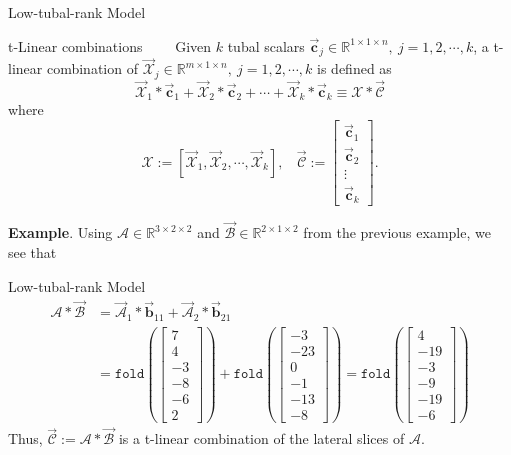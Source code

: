 \documentclass[t, 10pt, handout, aspectratio=169]{beamer}
\begin{document}
\begin{frame}{Low-tubal-rank Model}
\begin{block}{t-Linear combinations}
~~~~Given $k$ tubal scalars $\vec{\mathbf{c}}_j\in\mathbb{R}^{1\times 1\times n},~j=1,2,\cdots,k$, a t-linear combination of $\vec{\mathcal{X}}_j\in \mathbb{R}^{m\times 1\times n},~j=1,2,\cdots,k$ is defined as
$$
\vec{\mathcal{X}}_1*\vec{\mathbf{c}}_1 + \vec{\mathcal{X}}_2 * \vec{\mathbf{c}}_2 + \cdots + \vec{\mathcal{X}}_k * \vec{\mathbf{c}}_k \equiv \mathcal{X} * \vec{\mathcal{C}}
$$
where
$$
\mathcal{X} := \left[\vec{\mathcal{X}}_1, \vec{\mathcal{X}}_2, \cdots, \vec{\mathcal{X}}_k\right],~~~~\vec{\mathcal{C}}:=\left[\begin{matrix}
\vec{\mathbf{c}}_1\\
\vec{\mathbf{c}}_2\\
\vdots\\
\vec{\mathbf{c}}_k
\end{matrix}\right].
$$
\end{block}
\textbf{Example}. Using $\mathcal{A}\in\mathbb{R}^{3\times 2 \times 2}$ and $\vec{\mathcal{B}}\in\mathbb{R}^{2\times 1\times 2}$ from the previous example, we see that

\end{frame}

\begin{frame}{Low-tubal-rank Model}
$$
\begin{aligned}
\mathcal{A}*\vec{\mathcal{B}} & = \vec{\mathcal{A}}_1 * \vec{\mathbf{b}}_{11} + \vec{\mathcal{A}}_2 * \vec{\mathbf{b}}_{21} \\
& = \texttt{fold}\left(
\left[\begin{array}{c}
7\\
4\\
-3\\
\hline
-8\\
-6\\
2
\end{array}\right]
\right) + \texttt{fold}\left(
\left[\begin{array}{c}
-3\\
-23\\
0\\
\hline
-1\\
-13\\
-8
\end{array}\right]
\right)=\texttt{fold}\left(
\left[\begin{array}{c}
4\\
-19\\
-3\\
\hline
-9\\
-19\\
-6
\end{array}\right]
\right)
\end{aligned}
$$
Thus, $\vec{\mathcal{C}} := \mathcal{A} * \vec{\mathcal{B}}$ is a t-linear combination of the lateral slices of $\mathcal{A}$.
\end{frame}
\end{document}
